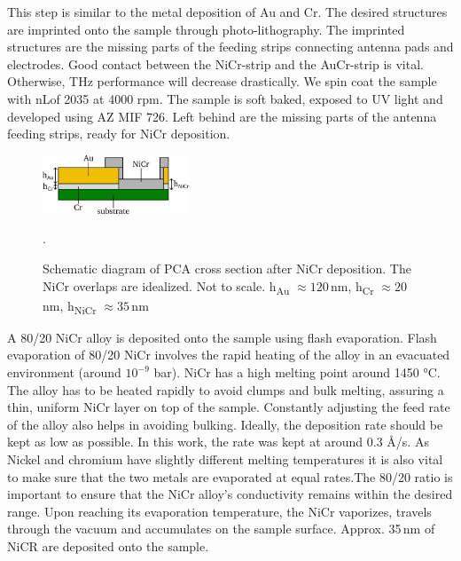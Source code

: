 This step is similar to the metal deposition of Au and Cr. The desired structures are imprinted onto the sample through photo-lithography. The imprinted structures are the missing parts of the feeding strips connecting antenna pads and electrodes. Good contact between the NiCr-strip and the AuCr-strip is vital. Otherwise, THz performance will decrease drastically. We spin coat the sample with nLof 2035 at \num{4000} rpm. The sample is soft baked, exposed to UV light and developed using AZ MIF 726. Left behind are the missing parts of the antenna feeding strips, ready for NiCr deposition.

\begin{figure} %
    \centering
    \includegraphics[width=0.39\textwidth]{figures/Fabrication/PCA_after_NiCr.pdf}
    \captionsetup{width=0.375\textwidth} %
    \caption{Schematic diagram of PCA cross section after NiCr deposition. The NiCr overlaps are idealized. Not to scale.  h\textsubscript{Au} $\approx 120$\,\si{\nano \meter}, h\textsubscript{Cr} $\approx 20$\,\si{\nano \meter}, h\textsubscript{NiCr} $\approx 35$\,\si{\nano \meter}}.
    \label{fig:afterFab}
\end{figure}

A \num{80}/\num{20} NiCr alloy is deposited onto the sample using flash evaporation. Flash evaporation of \num{80}/\num{20} NiCr involves the rapid heating of the alloy in an evacuated environment (around $10^{-9}$ \si{\bar}). NiCr has a high melting point around \num{1450} \si{\celsius}. The alloy has to be heated rapidly to avoid clumps and bulk melting, assuring a thin, uniform NiCr layer on top of the sample. Constantly adjusting the feed rate of the alloy also helps in avoiding bulking. Ideally, the deposition rate should be kept as low as possible. In this work, the rate was kept at around \num{0.3} \si{\angstrom}/\si{\s}. As Nickel and chromium have slightly different melting temperatures it is also vital to make sure that the two metals are evaporated at equal rates.The 80/20 ratio is important to ensure that the NiCr alloy’s conductivity remains within the desired range. Upon reaching its evaporation temperature, the NiCr vaporizes, travels through the vacuum and accumulates on the sample surface. Approx. \num{35}\,\si{\nano \meter} of NiCR are deposited onto the sample. 
